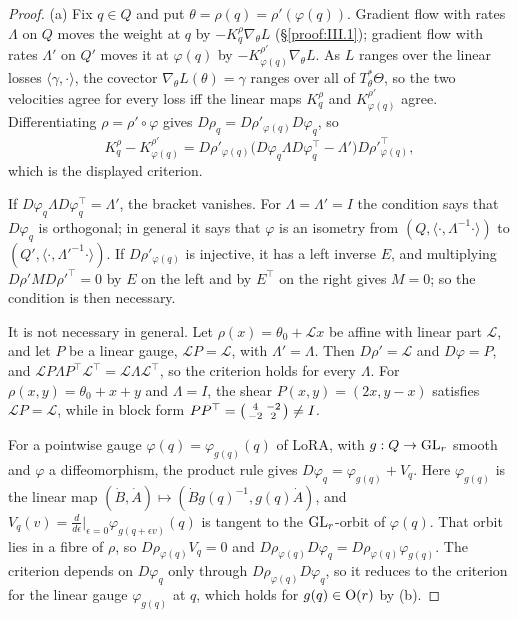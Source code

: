 \begin{proof}
(a) Fix $q\in Q$ and put $\theta=\rho(q)=\rho'(\varphi(q))$. Gradient flow with rates $\Lambda$ on $Q$ moves the weight
at $q$ by $-K^\rho_q\nabla_\theta L$ (\S\ref{proof:III.1}); gradient flow with rates $\Lambda'$ on $Q'$ moves it at
$\varphi(q)$ by $-K^{\rho'}_{\varphi(q)}\nabla_\theta L$. As $L$ ranges over the linear losses $\langle\gamma,\cdot\rangle$,
the covector $\nabla_\theta L(\theta)=\gamma$ ranges over all of $T^*_\theta\Theta$, so the two velocities agree for every
loss iff the linear maps $K^\rho_q$ and $K^{\rho'}_{\varphi(q)}$ agree. Differentiating $\rho=\rho'\circ\varphi$ gives
$D\rho_q=D\rho'_{\varphi(q)}D\varphi_q$, so
\[K^\rho_q-K^{\rho'}_{\varphi(q)}=D\rho'_{\varphi(q)}\big(D\varphi_q\Lambda D\varphi_q^\top-\Lambda'\big)D\rho'^\top_{\varphi(q)},\]
which is the displayed criterion.

If $D\varphi_q\Lambda D\varphi_q^\top=\Lambda'$, the bracket vanishes. For $\Lambda=\Lambda'=I$ the condition says that
$D\varphi_q$ is orthogonal; in general it says that $\varphi$ is an isometry from $(Q,\langle\cdot,\Lambda^{-1}\cdot\rangle)$
to $(Q',\langle\cdot,\Lambda'^{-1}\cdot\rangle)$. If $D\rho'_{\varphi(q)}$ is injective, it has a left inverse $E$, and
multiplying $D\rho'MD\rho'^\top=0$ by $E$ on the left and by $E^\top$ on the right gives $M=0$; so the condition is then
necessary.

It is not necessary in general. Let $\rho(x)=\theta_0+\mathcal Lx$ be affine with linear part $\mathcal L$, and let $P$
be a linear gauge, $\mathcal LP=\mathcal L$, with $\Lambda'=\Lambda$. Then $D\rho'=\mathcal L$ and $D\varphi=P$, and
$\mathcal LP\Lambda P^\top\mathcal L^\top=\mathcal L\Lambda\mathcal L^\top$, so the criterion holds for every
$\Lambda$. For $\rho(x,y)=\theta_0+x+y$ and $\Lambda=I$, the shear $P(x,y)=(2x,y-x)$ satisfies $\mathcal LP=\mathcal L$,
while in block form $PP^\top=\begin{psmallmatrix}4&-2\\-2&2\end{psmallmatrix}\ne I$.

For a pointwise gauge $\varphi(q)=\varphi_{g(q)}(q)$ of LoRA, with $g:Q\to\mathrm{GL}_r$ smooth and $\varphi$ a diffeomorphism,
the product rule gives $D\varphi_q=\varphi_{g(q)}+V_q$. Here $\varphi_{g(q)}$ is the linear map
$(\dot B,\dot A)\mapsto(\dot Bg(q)^{-1},g(q)\dot A)$, and $V_q(v)=\frac{d}{d\epsilon}\big|_{\epsilon=0}\varphi_{g(q+\epsilon v)}(q)$
is tangent to the $\mathrm{GL}_r$-orbit of $\varphi(q)$. That orbit lies in a fibre of $\rho$, so $D\rho_{\varphi(q)}V_q=0$ and
$D\rho_{\varphi(q)}D\varphi_q=D\rho_{\varphi(q)}\varphi_{g(q)}$. The criterion depends on $D\varphi_q$ only through
$D\rho_{\varphi(q)}D\varphi_q$, so it reduces to the criterion for the linear gauge $\varphi_{g(q)}$ at $q$, which holds
for $g(q)\in\mathrm{O}(r)$ by (b).


\end{proof}
